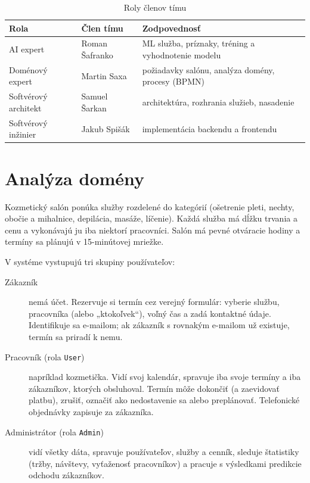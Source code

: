 \begin{table}[ht]
  \centering
  \caption{Roly členov tímu}\label{tab:team}
  \begin{tabular}{@{}llp{}@{}}
    \toprule
    Rola & Člen tímu & Zodpovednosť \\
    \midrule
    AI expert & Roman Šafranko & ML služba, príznaky, tréning a vyhodnotenie modelu \\
    Doménový expert & Martin Saxa & požiadavky salónu, analýza domény, procesy (BPMN) \\
    Softvérový architekt & Samuel Šarkan & architektúra, rozhrania služieb, nasadenie \\
    Softvérový inžinier & Jakub Spišák & implementácia backendu a frontendu \\
    \bottomrule
  \end{tabular}
\end{table}

\section{Analýza domény}

Kozmetický salón ponúka služby rozdelené do kategórií (ošetrenie pleti, nechty, obočie a mihalnice, depilácia, masáže, líčenie). Každá služba má dĺžku trvania a cenu a vykonávajú ju iba niektorí pracovníci. Salón má pevné otváracie hodiny a termíny sa plánujú v 15-minútovej mriežke.

V systéme vystupujú tri skupiny používateľov:

\begin{description}
  \item[Zákazník] nemá účet. Rezervuje si termín cez verejný formulár: vyberie službu, pracovníka (alebo „ktokoľvek“), voľný čas a zadá kontaktné údaje. Identifikuje sa e-mailom; ak zákazník s rovnakým e-mailom už existuje, termín sa priradí k nemu.
  \item[Pracovník (rola \texttt{User})] napríklad kozmetička. Vidí svoj kalendár, spravuje iba svoje termíny a iba zákazníkov, ktorých obsluhoval. Termín môže dokončiť (a zaevidovať platbu), zrušiť, označiť ako nedostavenie sa alebo preplánovať. Telefonické objednávky zapisuje za zákazníka.
  \item[Administrátor (rola \texttt{Admin})] vidí všetky dáta, spravuje používateľov, služby a cenník, sleduje štatistiky (tržby, návštevy, vyťaženosť pracovníkov) a pracuje s výsledkami predikcie odchodu zákazníkov.
\end{description}

